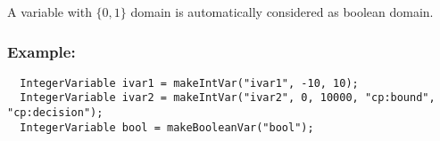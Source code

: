 A variable with $\{0,1\}$ domain is automatically considered as boolean domain.

\subsubsection{Example:}
\begin{lstlisting}
  IntegerVariable ivar1 = makeIntVar("ivar1", -10, 10);
  IntegerVariable ivar2 = makeIntVar("ivar2", 0, 10000, "cp:bound", "cp:decision");
  IntegerVariable bool = makeBooleanVar("bool");
\end{lstlisting} 
